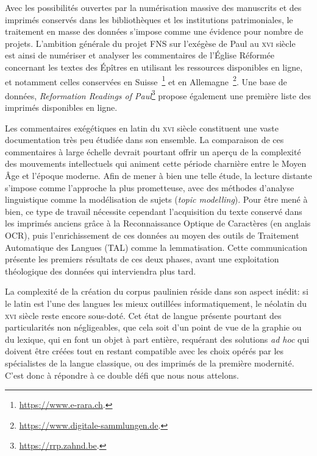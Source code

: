 \documentclass[11pt,french]{article}
\begin{document}
Avec les possibilités ouvertes par la numérisation massive des manuscrits et des imprimés conservés dans les bibliothèques et les institutions patrimoniales, le traitement en masse des données s'impose comme une évidence pour nombre de projets. L'ambition générale du projet FNS sur l'exégèse de Paul au \textsc{xvi}\ieme{} siècle~\cite{exegesisofPaul_2023} est ainsi de numériser et analyser les commentaires de l'Église Réformée concernant les textes des Épîtres en utilisant les ressources disponibles en ligne, et notamment celles conservées en Suisse~\footnote{\url{https://www.e-rara.ch}.} et en Allemagne~\footnote{\url{https://www.digitale-sammlungen.de}.}. Une base de données, \textit{Reformation Readings of Paul}\footnote{\url{https://rrp.zahnd.be}.} propose également une première liste des imprimés disponibles en ligne.

Les commentaires exégétiques en latin du \textsc{xvi}\ieme{} siècle constituent une vaste documentation très peu étudiée dans son ensemble. La comparaison de ces commentaires à large échelle devrait pourtant offrir un aperçu de la complexité des mouvements intellectuels qui animent cette période charnière entre le Moyen Âge et l'époque moderne. Afin de mener à bien une telle étude, la lecture distante s'impose comme l'approche la plus prometteuse, avec des méthodes d'analyse linguistique comme la modélisation de sujets (\textit{topic modelling}). Pour être mené à bien, ce type de travail nécessite cependant l'acquisition du texte conservé dans les imprimés anciens grâce à la Reconnaissance Optique de Caractères (en anglais OCR), puis l'enrichissement de ces données au moyen des outils de Traitement Automatique des Langues (TAL) comme la lemmatisation. Cette communication présente les premiers résultats de ces deux phases, avant une exploitation théologique des données qui interviendra plus tard.

La complexité de la création du corpus paulinien réside dans son aspect inédit: si le latin est l'une des langues les mieux outillées informatiquement, le néolatin du \textsc{xvi}\ieme{} siècle reste encore sous-doté. Cet état de langue présente pourtant des particularités non négligeables, que cela soit d'un point de vue de la graphie ou du lexique, qui en font un objet à part entière, requérant des solutions \textit{ad hoc} qui doivent être créées tout en restant compatible avec les choix opérés par les spécialistes de la langue classique, ou des imprimés de la première modernité. C'est donc à répondre à ce double défi que nous nous attelons.
\end{document}
